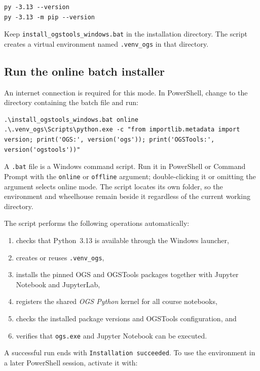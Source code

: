\documentclass[11pt,a4paper]{tubaf-report}
\begin{document}
\begin{lstlisting}[style=terminal]
py -3.13 --version
py -3.13 -m pip --version
\end{lstlisting}

Keep \texttt{install\_ogstools\_windows.bat} in the installation directory. The
script creates a virtual environment named \texttt{.venv\_ogs} in that directory.

\subsection{Run the online batch installer}

An internet connection is required for this mode. In PowerShell, change to the
directory containing the batch file and run:

\begin{lstlisting}[style=terminal]
.\install_ogstools_windows.bat online
.\.venv_ogs\Scripts\python.exe -c "from importlib.metadata import version; print('OGS:', version('ogs')); print('OGSTools:', version('ogstools'))"
\end{lstlisting}

A \texttt{.bat} file is a Windows command script. Run it in PowerShell or
Command Prompt with the \texttt{online} or \texttt{offline} argument;
double-clicking it or omitting the argument selects online mode. The script
locates its own folder, so the environment and wheelhouse remain beside it
regardless of the current working directory.

The script performs the following operations automatically:

\begin{enumerate}
    \item checks that Python~3.13 is available through the Windows launcher,
    \item creates or reuses \texttt{.venv\_ogs},
    \item installs the pinned OGS and OGSTools packages together with
          Jupyter Notebook and JupyterLab,
    \item registers the shared \emph{OGS Python} kernel for all course notebooks,
    \item checks the installed package versions and OGSTools configuration, and
    \item verifies that \texttt{ogs.exe} and Jupyter Notebook can be executed.
\end{enumerate}

A successful run ends with \texttt{Installation succeeded}. To use the
environment in a later PowerShell session, activate it with:
\end{document}
